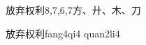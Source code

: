 \begin{entry}{放弃权利}{8,7,6,7}{⽅、⼶、⽊、⼑}
  \begin{phonetics}{放弃权利}{fang4qi4 quan2li4}
  \end{phonetics}
\end{entry}
